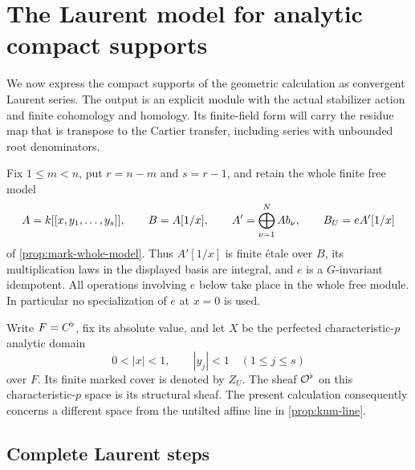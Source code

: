\section{The Laurent model for analytic compact supports}
\label{sec:laurent}

We now express the compact supports of the geometric calculation as
convergent Laurent series. The output is an explicit module with the
actual stabilizer action and finite cohomology and homology. Its
finite-field form will carry the residue map that is transpose to the
Cartier transfer, including series with unbounded root denominators.

Fix $1\leq m<n$, put $r=n-m$ and $s=r-1$, and retain the
whole finite free model
\[
 A=k[[x,y_1,\ldots,y_s]],\qquad B=A[1/x],\qquad
 A'=\bigoplus_{\nu=1}^{N}A b_\nu,\qquad B_U=eA'[1/x]
\]
of \cref{prop:mark-whole-model}.  Thus $A'[1/x]$ is finite
\'{e}tale over $B$, its multiplication laws in the displayed basis are
integral, and $e$ is a $G$-invariant idempotent.  All operations involving
$e$ below take place in the whole free module.  In particular no
specialization of $e$ at $x=0$ is used.

Write $F=C^\flat$, fix its absolute value, and let $X$ be the perfected
characteristic-$p$ analytic domain
\[
 0<|x|<1,\qquad |y_j|<1\quad(1\leq j\leq s)
\]
over $F$.  Its finite marked cover is denoted by $Z_U$.  The sheaf
$\mathcal O^\flat$ on this characteristic-$p$ space is its structural sheaf.
The present calculation consequently concerns a different space from the
untilted affine line in \cref{prop:kum-line}.

\subsection{Complete Laurent steps}

